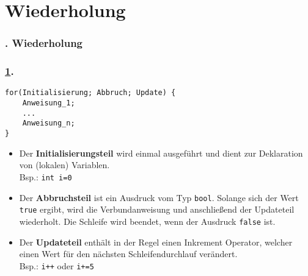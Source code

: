 \section{Wiederholung}\label{K:wdh}
\begin{frame}
  \frametitle{\kap. Wiederholung}%
\tableofcontents[current]
\end{frame}

\begin{frame}[fragile]%
  \frametitle{\ref{K:wdh}.\thesubsection\ \stitle}%

\begin{lstlisting}[style=java]
for(Initialisierung; Abbruch; Update) {
    Anweisung_1;
    ...
    Anweisung_n;
}
\end{lstlisting}
\begin{itemize}
\item Der \textbf{\textcolor{KITblue}{Initialisierungsteil}}  wird einmal ausgef\"uhrt und dient zur
    Deklaration von (lokalen) Variablen. \\ Bsp.: \lstinline|int i=0|
\item Der \textbf{\textcolor{KITblue}{Abbruchsteil}}  ist ein Ausdruck vom Typ
    \textcolor{KITgreen}{\lstinline|bool|}. Solange sich der Wert
    \textcolor{KITgreen}{\lstinline|true|} ergibt, wird die Verbundanweisung und
    anschlie\ss{}end der Updateteil wiederholt. Die Schleife wird beendet, wenn
    der Ausdruck \textcolor{KITgreen}{\lstinline|false|} ist.
\item Der \textbf{\textcolor{KITblue}{Updateteil}}  enth\"alt in der Regel einen Inkrement Operator, welcher einen Wert f\"ur den n\"achsten Schleifendurchlauf ver\"andert. \\ Bsp.: \lstinline|i++| oder \lstinline|i+=5|
\end{itemize}
\end{frame}
